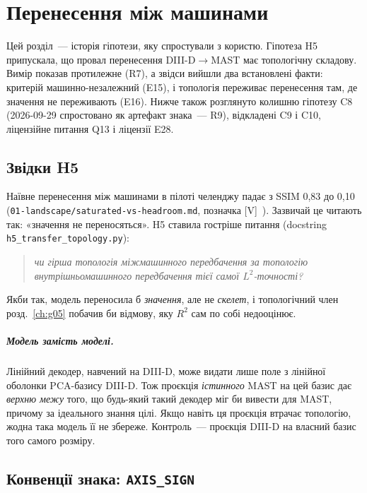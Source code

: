 \chapter{Перенесення між машинами}\label{ch:g06}

Цей розділ~--- історія гіпотези, яку спростували з користю. Гіпотеза H5 припускала, що провал перенесення DIII-D$\to$MAST має топологічну складову. Вимір показав протилежне (R7), а звідси вийшли два встановлені факти: критерій машинно-незалежний (E15), і топологія переживає перенесення там, де значення не переживають (E16). Нижче також розглянуто колишню гіпотезу C8 (2026-09-29 спростовано як артефакт знака~--- R9), відкладені C9 і C10, ліцензійне питання Q13 і ліцензії E28.

\section{Звідки H5}\label{sec:g06-h5}

Наївне перенесення між машинами в пілоті челенджу падає з SSIM 0,83 до 0,10 (\texttt{01-landscape/\allowbreak saturated-vs-\allowbreak headroom.md}, позначка [V]~\cite{g06Headroom}). Зазвичай це читають так: «значення не переносяться». H5 ставила гостріше питання (docstring \texttt{h5\_transfer\_topology.py}):

\begin{quote}\itshape
чи гірша топологія міжмашинного передбачення за топологію внутрішньомашинного передбачення тієї самої $L^2$-точності?
\end{quote}

Якби так, модель переносила б \emph{значення}, але не \emph{скелет}, і топологічний член розд.~\ref{ch:g05} побачив би відмову, яку $R^2$ сам по собі недооцінює.

\paragraph{Модель замість моделі.} Лінійний декодер, навчений на DIII-D, може видати лише поле з лінійної оболонки PCA-базису DIII-D. Тож проєкція \emph{істинного} MAST на цей базис дає \emph{верхню межу} того, що будь-який такий декодер міг би вивести для MAST, причому за ідеального знання цілі. Якщо навіть ця проєкція втрачає топологію, жодна така модель її не збереже. Контроль~--- проєкція DIII-D на власний базис того самого розміру.

\section{Конвенції знака: \texttt{AXIS\_SIGN}}\label{sec:g06-sign}

